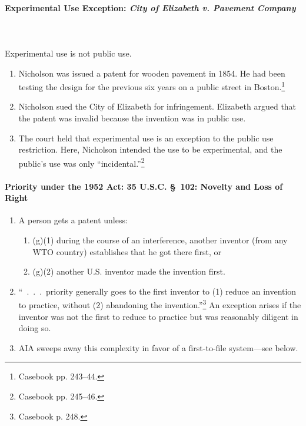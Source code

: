 \paragraph{Experimental Use Exception: \emph{City of Elizabeth v. Pavement 
Company}}
~\\\\
Experimental use is not public use.

\begin{enumerate}
    \item Nicholson was issued a patent for wooden pavement in 1854. He had been 
    testing the design for the previous six years on a public street in 
    Boston.\footnote{Casebook pp. 243--44.}
    \item Nicholson sued the City of Elizabeth for infringement. Elizabeth 
    argued that the patent was invalid because the invention was in public use.
    \item The court held that experimental use is an exception to the public use 
    restriction. Here, Nicholson intended the use to be experimental, and the 
    public's use was only ``incidental.''\footnote{Casebook pp. 245--46.}
\end{enumerate}

\paragraph{Priority under the 1952 Act: 35 U.S.C. \S\ 102: Novelty and Loss of 
Right}

\begin{enumerate}
    \item A person gets a patent unless:
    \begin{enumerate}
        \item (g)(1) during the course of an interference, another inventor (from 
        any WTO country) establishes that he got there first, or
        \item (g)(2) another U.S. inventor made the invention first.
    \end{enumerate}
    \item ``~.~.~.~priority generally goes to the first inventor to (1) reduce 
    an invention to practice, without (2) abandoning the 
    invention.''\footnote{Casebook p. 248.} An exception arises if the inventor 
    was not the first to reduce to practice but was reasonably diligent in doing 
    so.
    \item AIA sweeps away this complexity in favor of a first-to-file 
    system---see below. 
\end{enumerate}

